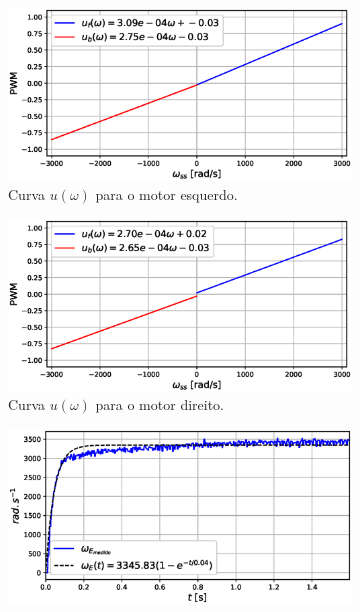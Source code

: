 \begin{figure}[H]
    \begin{subfigure}{.5\textwidth}
    \centering
    \includegraphics[width=\textwidth]{figuras/resultados/exp04/curva_feedforward_esquerdo100.eps}
    \caption{Curva $u(\omega)$ para o motor esquerdo.}
    \label{fig:exp04:curva_feedforward_esquerdo}
    \end{subfigure}
    \hfill
    \begin{subfigure}{.5\textwidth}
    \centering
    \includegraphics[width=\textwidth]{figuras/resultados/exp04/curva_feedforward_direito100.eps}
    \caption{Curva $u(\omega)$ para o motor direito.}
    \label{fig:exp04:curva_feedforward_direito}
    \end{subfigure}
    \begin{subfigure}{.5\textwidth}
    \centering
    \includegraphics[width=\textwidth]{figuras/resultados/exp04/regressao_vs_medido_esquerdo100.eps}

\end{subfigure}
\end{figure}

